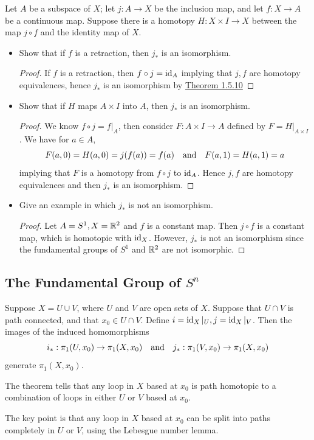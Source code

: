 \documentclass[12pt,a4paper]{article}
\begin{document}
    \begin{ex}
        Let $A$ be a subspace of $X$; let $j:A\to X$ be the inclusion map, and let $f:X\to A$ be a continuous map. Suppose there is a homotopy $H:X\times I\to X$ between the map $j\circ f$ and the identity map of $X$.
        \begin{itemize}
            \item Show that if $f$ is a retraction, then $j_*$ is an isomorphism.
            \begin{proof}
                If $f$ is a retraction, then $f\circ j=\operatorname{id}_A$ implying that $j,f$ are homotopy equivalences, hence $j_*$ is an isomorphism by \hyperref[1.5.10]{Theorem 1.5.10}
            \end{proof}
            \item Show that if $H$ maps $A\times I$ into $A$, then $j_*$ is an isomorphism.
            \begin{proof}
                We know $f\circ j=f|_A$, then consider $F:A\times I\to A$ defined by $F=H|_{A\times I}$. We have for $a\in A$, 
                \[
                    F(a,0)=H(a,0)=j(f(a))=f(a)\quad\text{and}\quad F(a,1)=H(a,1)=a
                \]
                implying that $F$ is a homotopy from $f\circ j$ to $\operatorname{id}_A$. Hence $j,f$ are homotopy equivalences and then $j_*$ is an isomorphism.
            \end{proof}
            \item Give an example in which $j_*$ is not an isomorphism.
            \begin{proof}
                Let $A=S^1,X=\mathbb{R}^2$ and $f$ is a constant map. Then $j\circ f$ is a constant map, which is homotopic with $\operatorname{id}_X$. However, $j_*$ is not an isomorphism since the fundamental groups of $S^1$ and $\mathbb{R}^2$ are not isomorphic.
            \end{proof}
        \end{itemize}
    \end{ex}
    \bigskip

    \subsection{The Fundamental Group of $S^n$}
    \begin{thm}
        Suppose $X=U\cup V$, where $U$ and $V$ are open sets of $X$. Suppose that $U\cap V$ is path connected, and that $x_0\in U\cap V$. Define $i=\operatorname{id}_X|_U,j=\operatorname{id}_X|_V$. Then the images of the induced homomorphisms
        \[
            i_*:\pi_1(U,x_0)\to\pi_1(X,x_0)\quad\text{and}\quad j_*:\pi_1(V,x_0)\to \pi_1(X,x_0)
        \]
        generate $\pi_1(X,x_0)$.
    \end{thm}
    \begin{remark}
        The theorem tells that any loop in $X$ based at $x_0$ is path homotopic to a combination of loops in either $U$ or $V$ based at $x_0$.
    \end{remark}
    \begin{remark}
        The key point is that any loop in $X$ based at $x_0$ can be split into paths completely in $U$ or $V$, using the Lebesgue number lemma.
    \end{remark}
    \bigskip
\end{document}
